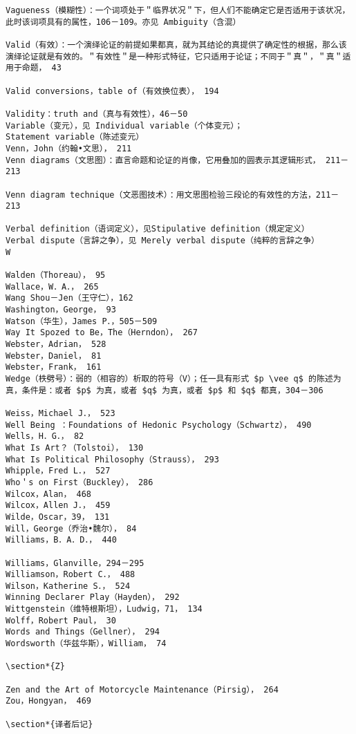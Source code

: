 \begin{verbatim}
Vagueness（模糊性）：一个词项处于＂临界状况＂下，但人们不能确定它是否适用于该状况，此时该词项具有的属性，106－109。亦见 Ambiguity（含混）

Valid（有效）：一个演绎论证的前提如果都真，就为其结论的真提供了确定性的根据，那么该演绎论证就是有效的。＂有效性＂是一种形式特征，它只适用于论证；不同于＂真＂，＂真＂适用于命题， 43

Valid conversions，table of（有效换位表）， 194

Validity：truth and（真与有效性），46－50
Variable（变元），见 Individual variable（个体变元）；
Statement variable（陈述变元）
Venn，John（约翰•文思）， 211
Venn diagrams（文思图）：直言命题和论证的肖像，它用叠加的圆表示其逻辑形式， 211－213

Venn diagram technique（文恶图技术）：用文思图检验三段论的有效性的方法，211－ 213

Verbal definition（语词定义），见Stipulative definition（規定定义）
Verbal dispute（言辞之争），见 Merely verbal dispute（纯粹的言辞之争）
W

Walden（Thoreau）， 95
Wallace，W．A．， 265
Wang Shou－Jen（王守仁），162
Washington，George， 93
Watson（华生），James P．，505－509
Way It Spozed to Be，The（Herndon）， 267
Webster，Adrian， 528
Webster，Daniel， 81
Webster，Frank， 161
Wedge（柣劈号）：弱的（相容的）析取的符号（V）；任一具有形式 $p \vee q$ 的陈述为真，条件是：或者 $p$ 为真，或者 $q$ 为真，或者 $p$ 和 $q$ 都真，304－306

Weiss，Michael J．， 523
Well Being ：Foundations of Hedonic Psychology（Schwartz）， 490
Wells，H．G．， 82
What Is Art？（Tolstoi）， 130
What Is Political Philosophy（Strauss）， 293
Whipple，Fred L．， 527
Who＇s on First（Buckley）， 286
Wilcox，Alan， 468
Wilcox，Allen J．， 459
Wilde，Oscar，39， 131
Will，George（乔治•魏尔）， 84
Williams，B．A．D．， 440

Williams，Glanville，294－295
Williamson，Robert C．， 488
Wilson，Katherine S．， 524
Winning Declarer Play（Hayden）， 292
Wittgenstein（维特根斯坦），Ludwig，71， 134
Wolff，Robert Paul， 30
Words and Things（Gellner）， 294
Wordsworth（华兹华斯），William， 74

\section*{Z}

Zen and the Art of Motorcycle Maintenance（Pirsig）， 264
Zou，Hongyan， 469

\section*{译者后记}


\end{verbatim}
